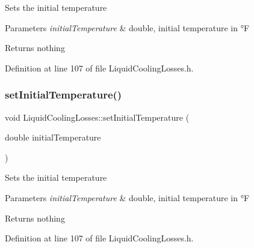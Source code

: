 Sets the initial temperature


\begin{DoxyParams}{Parameters}
{\em initial\+Temperature} & double, initial temperature in °F\\
\hline
\end{DoxyParams}
\begin{DoxyReturn}{Returns}
nothing 
\end{DoxyReturn}


Definition at line 107 of file Liquid\+Cooling\+Losses.\+h.

\mbox{\label{class_liquid_cooling_losses_aa7f7718de77a96b8e269a06a24d297d8}} 
\subsubsection{\texorpdfstring{set\+Initial\+Temperature()}{setInitialTemperature()}\hspace{0.1cm}{\footnotesize\ttfamily [2/3]}}
{\footnotesize\ttfamily void Liquid\+Cooling\+Losses\+::set\+Initial\+Temperature (\begin{DoxyParamCaption}\item[{double}]{initial\+Temperature }\end{DoxyParamCaption})\hspace{0.3cm}{\ttfamily [inline]}}

Sets the initial temperature


\begin{DoxyParams}{Parameters}
{\em initial\+Temperature} & double, initial temperature in °F\\
\hline
\end{DoxyParams}
\begin{DoxyReturn}{Returns}
nothing 
\end{DoxyReturn}


Definition at line 107 of file Liquid\+Cooling\+Losses.\+h.

\mbox{\label{class_liquid_cooling_losses_aa7f7718de77a96b8e269a06a24d297d8}} 

